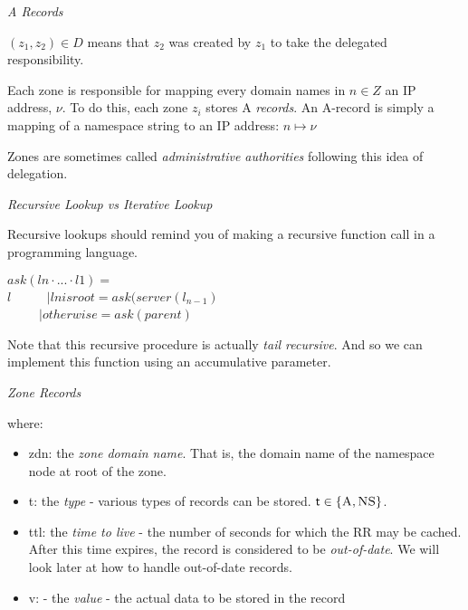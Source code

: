 \frmrule 

\begin{example}

\end{example}

\frmrule 


\textit{A Records}

$(z_1,z_2) \in D$ means that $z_2$ was created 
by $z_1$ to take the delegated responsibility.

Each zone is responsible for mapping every domain names in $n \in Z$ 
an IP address, $\nu$. To do this, each zone $z_i$ stores \textsc{A} \textit{records}. 
An \textsc{A}-record is simply a mapping of a namespace string to an IP address: $n \mapsto \nu$ 


Zones are sometimes called \textit{administrative authorities} following 
this idea of delegation. 

\frmrule 

\textit{Recursive Lookup vs Iterative Lookup}


Recursive lookups should remind you of making a recursive function call 
in a programming language. 

$ask(ln \cdot...\cdot l1)=$\\
$l$
~$\quad\quad | ln is root = ask(server(l_{n-1})$\\
~$\quad\quad | otherwise = ask(parent)$

Note that this recursive procedure is actually \textit{tail recursive}. And 
so we can implement this function using an accumulative parameter. 

\frmrule 

\textit{Zone Records}


where:
\begin{itemize}[nosep]
\renewcommand{\labelitemi}{$\Box$}
\item \textsf{zdn}: the \textit{zone domain name}. That is, the domain name of the namespace node at root of the zone.
\item \textsf{t}: the \textit{type} - various types of records can be stored. $\mathsf{t} \in \{\textsc{A},\textsc{NS}\}$.
\item \textsf{ttl}: the \textit{time to live} - the number of seconds for which the RR may be cached. After this time 
expires, the record is considered to be \textit{out-of-date}. We will look later at how to handle out-of-date records.
\item \textsf{v}: - the \textit{value} - the actual data to be stored in the record
\end{itemize}




